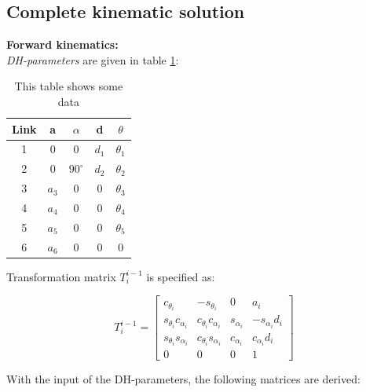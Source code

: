 \documentclass[11pt,a4paper, titlepage]{article}
\begin{document}
\begin{appendices}
\section{Complete kinematic solution}
\label{appendix:ik}

\textbf{Forward kinematics:} \\

\textit{DH-parameters} are given in table \ref{tab:DH}:
\begin{table}[h!]
\centering
\begin{tabular}{| c | c | c | c | c |}
\hline
Link 		& a 			& $\alpha$ 	& d & $\theta$ \\\hline
1 & 0 		& 0 			& $d_1$ 	& $\theta_1$ \\\hline
2 & 0 		& $90^\circ$ 	& $d_2$ 	& $\theta_2$ \\\hline
3 & $a_3$ 	& 0 			& 0 		& $\theta_3$ \\\hline
4 & $a_4$ 	& 0 			& 0 		& $\theta_4$ \\\hline
5 & $a_5$ 	& 0 			& 0 		& $\theta_5$ \\\hline
6 & $a_6$ 	& 0 			& 0 		& 0 \\\hline
\end{tabular}
  \caption{This table shows some data}
  \label{tab:DH}
\end{table}

Transformation matrix $T_i^{i-1}$ is specified as:

\begin{equation*}
T_i^{i-1} = \begin{bmatrix}
c_{\theta_i} & -s_{\theta_i} & 0 & a_i \\
s_{\theta_i}c_{\alpha_i} & c_{\theta_i}c_{\alpha_i} & s_{\alpha_i} & -s_{\alpha_i}d_i \\
s_{\theta_i}s_{\alpha_i} & c_{\theta_i}s_{\alpha_i} & c_{\alpha_i} & c_{\alpha_i}d_i \\
0 & 0 & 0 & 1
\end{bmatrix}
\end{equation*}

With the input of the DH-parameters, the following matrices are derived:


\end{appendices}
\end{document}
